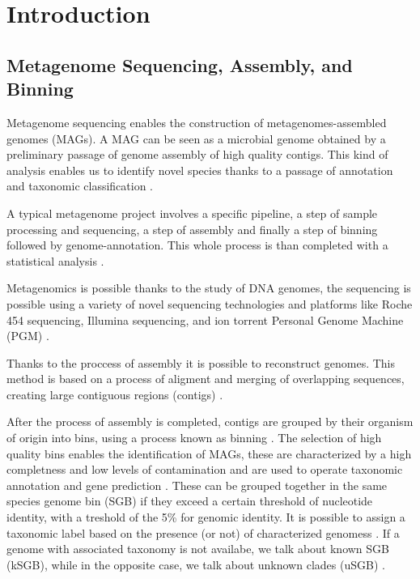 \documentclass[a4paper,titlepage]{book}
\begin{document}
\begin{frontespizio}
\Istituzione{}
\Punteggiatura{}
\end{frontespizio}

\tableofcontents

\chapter{Introduction}


\section{Metagenome Sequencing, Assembly, and Binning}
Metagenome sequencing enables the construction of metagenomes-assembled genomes (MAGs). A MAG can be seen as a microbial genome obtained by a preliminary passage of genome assembly of high quality contigs. This kind of analysis enables us to identify novel species thanks to a passage of annotation and taxonomic classification \cite{MAG}.

A typical metagenome project involves a specific pipeline, a step of sample processing and sequencing, a step of assembly and finally a step of binning followed by genome-annotation. This whole process is than completed with a statistical analysis \cite{Metagenome}.

Metagenomics is possible thanks to the study of DNA genomes, the sequencing is possible using a variety of novel sequencing technologies and platforms like Roche 454 sequencing, Illumina sequencing, and ion torrent Personal Genome Machine (PGM) \cite{Sequencing}.

Thanks to the proccess of assembly it is possible to reconstruct genomes. This method is based on a process of aligment and merging of overlapping sequences, creating large contiguous regions (contigs) \cite{Assembly}.

After the process of assembly is completed, contigs are grouped by their organism of origin into bins, using a process known as binning \cite{Binning}. The selection of high quality bins enables the identification of MAGs, these are characterized by a high completness and low levels of contamination and are used to operate taxonomic annotation and gene prediction \cite{MAG2}. These can be grouped together in the same species genome bin (SGB) if they exceed a certain threshold of nucleotide identity, with a treshold of the 5\% for genomic identity. It is possible to assign a taxonomic label based on the presence (or not) of characterized genomess \cite{SGB2}. If a genome with associated taxonomy is not availabe, we talk about known SGB (kSGB), while in the opposite case, we talk about unknown clades (uSGB) \cite{SGB}.
\end{document}
